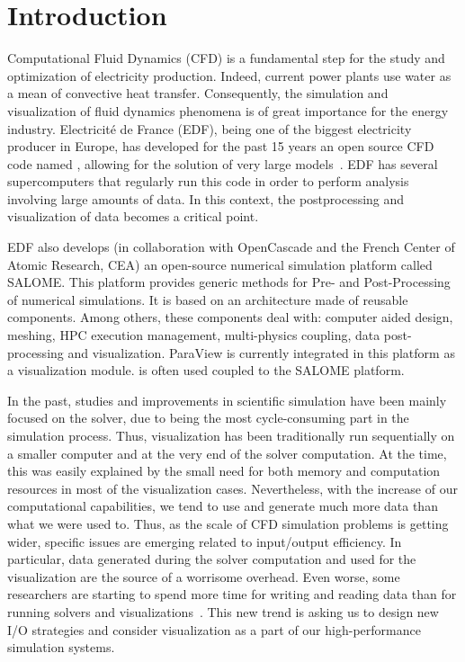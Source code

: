 \section{Introduction}
Computational Fluid Dynamics (CFD) is a fundamental step for the study and
optimization of electricity production. Indeed, current power plants use water
as a mean of convective heat transfer.  Consequently, the simulation and
visualization of fluid dynamics phenomena is of great importance for the energy
industry. Electricité de France (EDF), being one of the biggest electricity producer in Europe, has
developed for the past 15 years an open source CFD code named \CS,
allowing for the solution of very large models~\cite{5644955}. EDF has
several supercomputers that regularly run this code in order to perform
analysis involving large amounts of data. In this context, the postprocessing
and visualization of data becomes a critical point. 

EDF also develops (in collaboration with OpenCascade and the French Center of
Atomic Research, CEA) an open-source numerical simulation platform called
SALOME. This platform provides generic methods for Pre- and Post-Processing of
numerical simulations. It is based on an architecture made of reusable
components. Among others, these components deal with: computer aided design,
meshing, HPC execution management, multi-physics coupling, data post-processing
and visualization. ParaView is currently integrated in this platform as a
visualization module. \CS is often used coupled to the SALOME platform.

In the past, studies and improvements in scientific simulation have been mainly
focused on the solver, due to being the most cycle-consuming part in the
simulation process. Thus, visualization has been traditionally run sequentially
on a smaller computer and at the very end of the solver computation. At the
time, this was easily explained by the small need for both memory and
computation resources in most of the visualization cases. Nevertheless, with the
increase of our computational capabilities, we tend to use and generate much
more data than what we were used to. Thus, as the scale of CFD simulation
problems is getting wider, specific issues are emerging related to input/output
efficiency. In particular, data generated during the solver computation and
used for the visualization are the source of a worrisome overhead. Even worse,
some researchers are starting to spend more time for writing and reading data
than for running solvers and visualizations~\cite{1742-6596-125-1-012099}.
This new trend is asking us to design new I/O strategies and consider
visualization as a part of our high-performance simulation systems.



